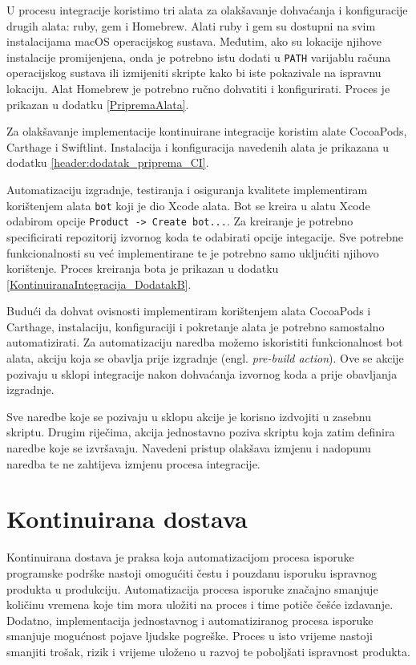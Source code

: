 \documentclass[times, utf8, diplomski, numeric]{fer}
\newcommand{\eng}[1]{(engl. \textit{#1})}
\begin{document}
U procesu integracije koristimo tri alata za olakšavanje dohvaćanja i konfiguracije drugih alata: ruby, gem i Homebrew. Alati ruby i gem su dostupni na svim instalacijama macOS operacijskog sustava. Međutim, ako su lokacije njihove instalacije promijenjena, onda je potrebno istu dodati u \verb|PATH| varijablu računa operacijskog sustava ili izmijeniti skripte kako bi iste pokazivale na ispravnu lokaciju. Alat Homebrew je potrebno ručno dohvatiti i konfigurirati. Proces je prikazan u dodatku \ref{PripremaAlata}.

Za olakšavanje implementacije kontinuirane integracije koristim alate CocoaPods, Carthage i Swiftlint. Instalacija i konfiguracija navedenih alata je prikazana u dodatku \ref{header:dodatak_priprema_CI}.

Automatizaciju izgradnje, testiranja i osiguranja kvalitete implementiram korištenjem alata \verb|bot| koji je dio Xcode alata. Bot se kreira u alatu Xcode odabirom opcije \verb|Product -> Create bot...|. Za kreiranje je potrebno specificirati repozitorij izvornog koda te odabirati opcije integacije. Sve potrebne funkcionalnosti su već implementirane te je potrebno samo ukljućiti njihovo korištenje. Proces kreiranja bota je prikazan u dodatku \ref{KontinuiranaIntegracija_DodatakB}.

Budući da dohvat ovisnosti implementiram korištenjem alata CocoaPods i Carthage, instalaciju, konfiguraciji i pokretanje alata je potrebno samostalno automatizirati. Za automatizaciju naredba možemo iskoristiti funkcionalnost bot alata, akciju koja se obavlja prije izgradnje \eng{pre-build action}. Ove se akcije pozivaju u sklopi integracije nakon dohvaćanja izvornog koda a prije obavljanja izgradnje.

Sve naredbe koje se pozivaju u sklopu akcije je korisno izdvojiti u zasebnu skriptu. Drugim riječima, akcija jednostavno poziva skriptu koja zatim definira naredbe koje se izvršavaju. Navedeni pristup olakšava izmjenu i nadopunu naredba te ne zahtijeva izmjenu procesa integracije.





\chapter{Kontinuirana dostava}

Kontinuirana dostava je praksa koja automatizacijom procesa isporuke programske podrške nastoji omogućiti čestu i pouzdanu isporuku ispravnog produkta u produkciju. Automatizacija procesa isporuke značajno smanjuje količinu vremena koje tim mora uložiti na proces i time potiče češće izdavanje. Dodatno, implementacija jednostavnog i automatiziranog procesa isporuke smanjuje mogućnost pojave ljudske pogreške. Proces u isto vrijeme nastoji smanjiti trošak, rizik i vrijeme uloženo u razvoj te poboljšati ispravnost produkta\citep{wiki:ContinuousDelivery}.
\end{document}
